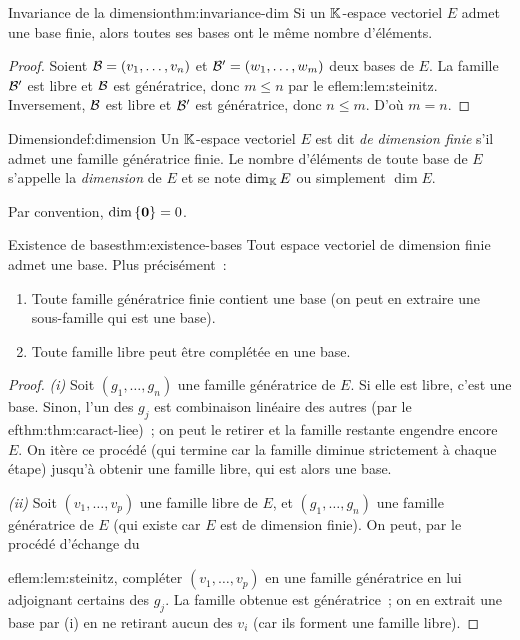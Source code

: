 \begin{theorem}{Invariance de la dimension}{thm:invariance-dim}
  Si un ${\mathbb{K}}$-espace vectoriel $E$ admet une base finie, alors toutes
  ses bases ont le même nombre d'éléments.
\end{theorem}

\begin{proof}
  Soient ${\mathcal{B}}=(v_1,\ldots,v_n)$ et ${\mathcal{B}}'=(w_1,\ldots,w_m)$ deux bases
  de $E$. La famille ${\mathcal{B}}'$ est libre et ${\mathcal{B}}$ est génératrice, donc
  $m\leq n$ par le 
ef{lem:lem:steinitz}. Inversement, ${\mathcal{B}}$ est libre
  et ${\mathcal{B}}'$ est génératrice, donc $n\leq m$. D'où $m=n$.
\end{proof}

\begin{definition}{Dimension}{def:dimension}
  Un ${\mathbb{K}}$-espace vectoriel $E$ est dit \emph{de dimension finie}%
   s'il admet une famille génératrice finie. Le
  nombre d'éléments de toute base de $E$ s'appelle la \emph{dimension}
  de $E$ et se note $\dim_{\mathbb{K}} E$ ou simplement $\dim E$.

  Par convention, $\dim\left\{\mathbf{0}\right\}=0$.
\end{definition}

\begin{theorem}{Existence de bases}{thm:existence-bases}
  Tout espace vectoriel de dimension finie admet une base. Plus
  précisément~:
  \begin{enumerate}[label=(\roman*)]
    \item Toute famille génératrice finie contient une base
      (on peut en extraire une sous-famille qui est une base).
    \item Toute famille libre peut être complétée en une base.
  \end{enumerate}
\end{theorem}

\begin{proof}
  \emph{(i)} Soit $(g_1,\ldots,g_n)$ une famille génératrice de $E$.
  Si elle est libre, c'est une base. Sinon, l'un des $g_j$ est
  combinaison linéaire des autres (par le 
ef{thm:thm:caract-liee})~; on
  peut le retirer et la famille restante engendre encore $E$. On
  itère ce procédé (qui termine car la famille diminue strictement à
  chaque étape) jusqu'à obtenir une famille libre, qui est alors une
  base.

  \emph{(ii)} Soit $(v_1,\ldots,v_p)$ une famille libre de $E$, et
  $(g_1,\ldots,g_n)$ une famille génératrice de $E$ (qui existe car
  $E$ est de dimension finie). On peut, par le procédé d'échange du
  
ef{lem:lem:steinitz}, compléter $(v_1,\ldots,v_p)$ en une famille
  génératrice en lui adjoignant certains des $g_j$. La famille obtenue
  est génératrice~; on en extrait une base par (i) en ne retirant
  aucun des $v_i$ (car ils forment une famille libre).
\end{proof}

